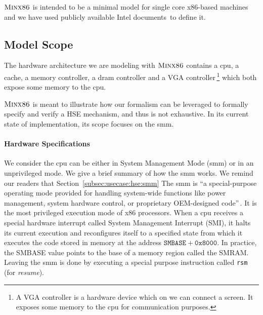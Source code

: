 $\textsc{Minx86}$ is intended to be a minimal model for single core x86-based
machines and we have used publicly available Intel
documents\,\cite{intel2013celeron,intel2009mch,intel2014manual} to define it.

\subsection{Model Scope}

The hardware architecture we are modeling with $\textsc{Minx86}$ contains a
\ac{cpu}, a cache, a memory controller, a \ac{dram} controller and a VGA
controller\,\footnote{A VGA controller is a hardware device which on we can
  connect a screen. It exposes some memory to the \ac{cpu} for communication
  purposes.} which both expose some memory to the \ac{cpu}.

$\textsc{Minx86}$ is meant to illustrate how our formalism can be leveraged
to formally specify and verify a HSE mechanism, and thus is not exhaustive.
%
In its current state of implementation, its scope focuses on the \ac{smm}.

\paragraph{Hardware Specifications}
%
We consider the \ac{cpu} can be either in System Management Mode (\ac{smm}) or
in an unprivileged mode.
%
We give a brief summary of how the \ac{smm} works.
%
We remind our readers that Section~\ref{subsec:usecase:hse:smm}
%
The \ac{smm} is ``a special-purpose operating mode provided for handling
system-wide functions like power management, system hardware control, or
proprietary OEM-designed code''\,\cite{intel2014manual}.
%
It is the most privileged execution mode of x86 processors.
%
When a \ac{cpu} receives a special hardware interrupt called System Management
Interrupt (SMI), it halts its current execution and reconfigures itself to a
specified state from which it executes the code stored in memory at the address
$\mathtt{SMBASE} + \texttt{0x8000}$.
%
In practice, the SMBASE value points to the base of a memory region called the
SMRAM.
%
Leaving the \ac{smm} is done by executing a special purpose instruction called
\texttt{rsm} (for \emph{resume}).

